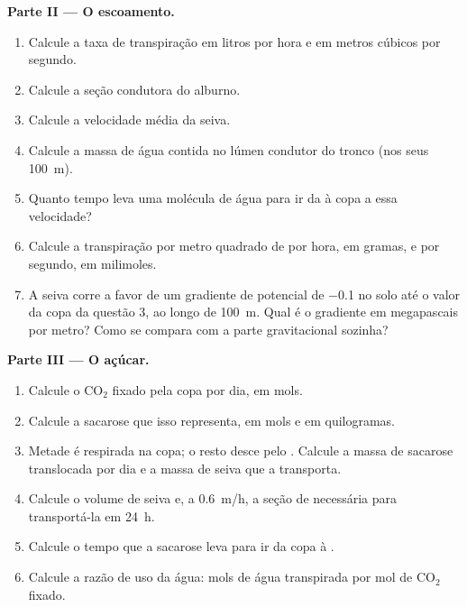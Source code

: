 \begin{problem}
\medskip
\noindent\textbf{Parte II --- O escoamento.}
\begin{enumerate}[resume]
  \item Calcule a taxa de transpiração em litros por hora e em metros
        cúbicos por segundo.
  \item Calcule a seção condutora do alburno.
  \item Calcule a velocidade média da seiva.
  \item Calcule a massa de água contida no lúmen condutor do tronco
        (nos seus \qty{100}{m}).
  \item Quanto tempo leva uma molécula de água para ir da  à copa
        a essa velocidade?
  \item Calcule a transpiração por metro quadrado de  por hora,
        em gramas, e por segundo, em milimoles.
  \item A seiva corre a favor de um gradiente de potencial de
        \qty{-0.1}{} no solo até o valor da copa da questão 3, ao longo
        de \qty{100}{m}. Qual é o gradiente em megapascais por metro?
        Como se compara com a parte gravitacional sozinha?
\end{enumerate}

\medskip
\noindent\textbf{Parte III --- O açúcar.}
\begin{enumerate}[resume]
  \item Calcule o $\mathrm{CO_2}$ fixado pela copa por dia, em mols.
  \item Calcule a sacarose que isso representa, em mols e em
        quilogramas.
  \item Metade é respirada na copa; o resto desce pelo . Calcule
        a massa de sacarose translocada por dia e a massa de seiva que
        a transporta.
  \item Calcule o volume de seiva e, a \qty{0.6}{m/h}, a seção de
         necessária para transportá-la em \qty{24}{h}.
  \item Calcule o tempo que a sacarose leva para ir da copa à .
  \item Calcule a razão de uso da água: mols de água transpirada por
        mol de $\mathrm{CO_2}$ fixado.
\end{enumerate}


\end{problem}
